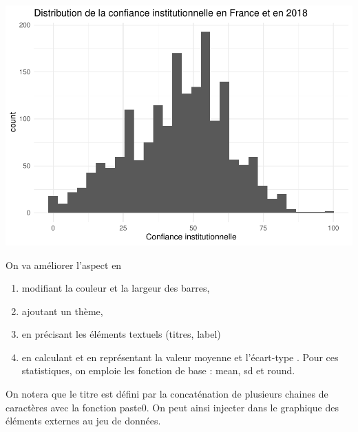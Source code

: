 \documentclass[
]{book}
\providecommand{\tightlist}{%
  \setlength{\itemsep}{0pt}\setlength{\parskip}{0pt}}
\begin{document}
\includegraphics{bookdown-demo_files/figure-latex/302-2.pdf}

On va améliorer l'aspect en

\begin{enumerate}
\def\labelenumi{\alph{enumi})}
\tightlist
\item
  modifiant la couleur et la largeur des barres,
\item
  ajoutant un thème,
\item
  en précisant les éléments textuels (titres, label)
\item
  en calculant et en représentant la valeur moyenne et l'écart-type . Pour ces statistiques, on emploie les fonction de base : mean, sd et round.
\end{enumerate}

On notera que le titre est défini par la concaténation de plusieurs chaines de caractères avec la fonction paste0. On peut ainsi injecter dans le graphique des éléments externes au jeu de données.
\end{document}
